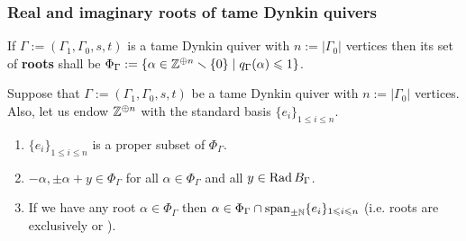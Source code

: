         \subsubsection{Real and imaginary roots of tame Dynkin quivers}
            \begin{definition} \label{def: roots_of_tame_dynkin_quivers}
                If $\Gamma := (\Gamma_1, \Gamma_0, s, t)$ is a tame Dynkin quiver with $n := |\Gamma_0|$ vertices then its set of \textbf{roots} shall be $\Phi_{\Gamma} := \{\alpha \in \mathbb{Z}^{\oplus n} \smallsetminus \{0\} \mid q_{\Gamma}(\alpha) \leqslant 1\}$.
            \end{definition}
            \begin{proposition} \label{prop: basic_properties_of_tame_dynkin_quivers}
                Suppose that $\Gamma := (\Gamma_1, \Gamma_0, s, t)$ be a tame Dynkin quiver with $n := |\Gamma_0|$ vertices. Also, let us endow $\mathbb{Z}^{\oplus n}$ with the standard basis $\{e_i\}_{1 \leq i \leq n}$.
                    \begin{enumerate}
                        \item $\{e_i\}_{1 \leq i \leq n}$ is a proper subset of $\Phi_{\Gamma}$.
                        \item $-\alpha, \pm\alpha + y \in \Phi_{\Gamma}$ for all $\alpha \in \Phi_{\Gamma}$ and all $y \in \operatorname{Rad} B_{\Gamma}$.
                        \item If we have any root $\alpha \in \Phi_{\Gamma}$ then $\alpha \in \Phi_{\Gamma} \cap \operatorname{span}_{\pm \mathbb{N}} \{e_i\}_{1 \leqslant i \leqslant n}$ (i.e. roots are exclusively  or ).
                    \end{enumerate}
            \end{proposition}

